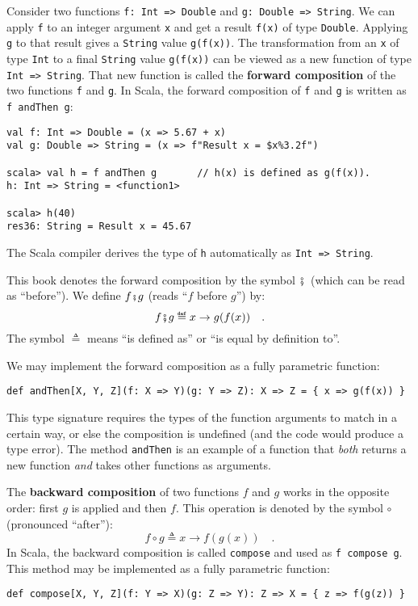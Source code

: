 Consider two functions \lstinline!f: Int => Double!
and \lstinline!g: Double => String!. We can apply \lstinline!f!
to an integer argument \lstinline!x! and get a result \lstinline!f(x)!
of type \lstinline!Double!. Applying \lstinline!g! to that result
gives a \lstinline!String! value \lstinline!g(f(x))!. The transformation
from an \lstinline!x! of type \lstinline!Int! to a final \lstinline!String!
value \lstinline!g(f(x))! can be viewed as a new function of type
\lstinline!Int => String!. That new function is called the \textbf{forward
composition} of the two functions \lstinline!f!
and \lstinline!g!. In Scala, the forward composition of \lstinline!f!
and \lstinline!g! is written as \lstinline!f andThen g!:
\begin{lstlisting}
val f: Int => Double = (x => 5.67 + x)
val g: Double => String = (x => f"Result x = $x%3.2f")

scala> val h = f andThen g       // h(x) is defined as g(f(x)).
h: Int => String = <function1>

scala> h(40)
res36: String = Result x = 45.67
\end{lstlisting}
The Scala compiler derives the type of \lstinline!h! automatically
as \lstinline!Int => String!.

This book denotes the forward composition by the symbol ${\displaystyle \bef}$
(which can be read as \textsf{``}before\textsf{''}). We define $f\bef g$ (reads \textsf{``}$f$
before $g$\textsf{''}) by:
\begin{equation}
f\bef g\triangleq x\rightarrow g(f(x))\quad.\label{eq:def-of-forward-composition}
\end{equation}
The symbol $\triangleq$ means \textsf{``}is defined as\textsf{''} or \textsf{``}is equal
by definition to\textsf{''}.

We may implement the forward composition as a fully parametric function:
\begin{lstlisting}
def andThen[X, Y, Z](f: X => Y)(g: Y => Z): X => Z = { x => g(f(x)) }
\end{lstlisting}
This type signature requires the types of the function arguments to
match in a certain way, or else the composition is undefined (and
the code would produce a type error). The method \lstinline!andThen!
is an example of a function that \emph{both} returns a new function
\emph{and} takes other functions as arguments.

The \textbf{backward composition} of
two functions $f$ and $g$ works in the opposite order: first $g$
is applied and then $f$. This operation is denoted by the symbol
$\circ$ (pronounced \textsf{``}after\textsf{''}):
\begin{equation}
f\circ g\triangleq x\rightarrow f(g(x))\quad.\label{eq:def-of-backward-composition}
\end{equation}
In Scala, the backward composition is called \lstinline!compose!
and used as \lstinline!f compose g!. This method may be implemented
as a fully parametric function:
\begin{lstlisting}
def compose[X, Y, Z](f: Y => X)(g: Z => Y): Z => X = { z => f(g(z)) }
\end{lstlisting}

